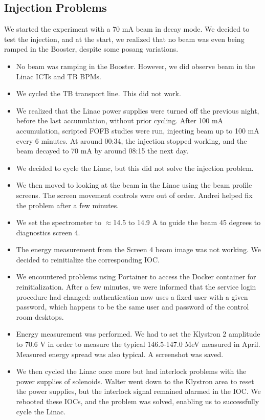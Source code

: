 \documentclass{article}
\begin{document}
\subsection{Injection Problems}
We started the experiment with a 70 mA beam in decay mode. We decided to test the injection, and at the start, we realized that no beam was even being ramped in the Booster, despite some posang variations.
\begin{itemize}
\item No beam was ramping in the Booster. However, we did observe beam in the Linac ICTs and TB BPMs.
\item We cycled the TB transport line. This did not work.
\item We realized that the Linac power supplies were turned off the previous night, before the last accumulation, without prior cycling. After 100 mA accumulation, scripted FOFB studies were run, injecting beam up to 100 mA every 6 minutes. At around 00:34, the injection stopped working, and the beam decayed to 70 mA by around 08:15 the next day.
\item We decided to cycle the Linac, but this did not solve the injection problem.
\item We then moved to looking at the beam in the Linac using the beam profile screens. The screen movement controls were out of order. Andrei helped fix the problem after a few minutes.
\item We set the spectrometer to $\approx$14.5 to 14.9 A to guide the beam 45 degrees to diagnostics screen 4.
\item The energy measurement from the Screen 4 beam image was not working. We decided to reinitialize the corresponding IOC.
\item We encountered problems using Portainer to access the Docker container for reinitialization. After a few minutes, we were informed that the service login procedure had changed: authentication now uses a fixed user with a given password, which happens to be the same user and password of the control room desktops.
\item Energy measurement was performed. We had to set the Klystron 2 amplitude to 70.6 V in order to measure the typical 146.5-147.0 MeV measured in April. Measured energy spread was also typical. A screenshot was saved.
\item We then cycled the Linac once more but had interlock problems with the power supplies of solenoids. Walter went down to the Klystron area to reset the power supplies, but the interlock signal remained alarmed in the IOC. We rebooted these IOCs, and the problem was solved, enabling us to successfully cycle the Linac.

\end{itemize}
\end{document}
